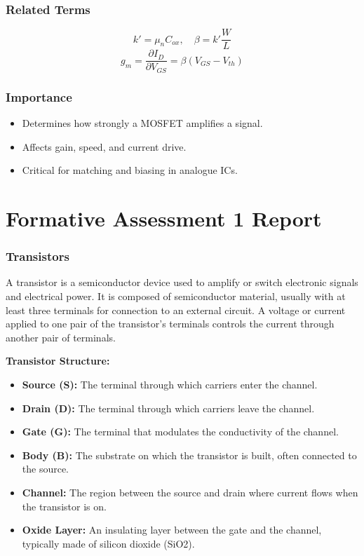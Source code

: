 \documentclass[a4paper,12pt]{article}
\begin{document}
\subsubsection{Related Terms}
\[
k' = \mu_n C_{ox}, \quad \beta = k'\frac{W}{L}
\]
\[
g_m = \frac{\partial I_D}{\partial V_{GS}} = \beta(V_{GS} - V_{th})
\]

\subsubsection{Importance}
\begin{itemize}
    \item Determines how strongly a MOSFET amplifies a signal.
    \item Affects gain, speed, and current drive.
    \item Critical for matching and biasing in analogue ICs.
\end{itemize}

\section{Formative Assessment 1 Report}

\subsubsection{Transistors}
A transistor is a semiconductor device used to amplify or switch electronic signals and electrical power. 
It is composed of semiconductor material, usually with at least three terminals for connection to an external circuit. A voltage or current applied to one pair of the transistor's terminals controls the current through another pair of terminals.

\textbf{Transistor Structure:}

\begin{itemize}
    \item \textbf{Source (S):} The terminal through which carriers enter the channel.
    \item \textbf{Drain (D):} The terminal through which carriers leave the channel.
    \item \textbf{Gate (G):} The terminal that modulates the conductivity of the channel.
    \item \textbf{Body (B):} The substrate on which the transistor is built, often connected to the source.
    \item \textbf{Channel:} The region between the source and drain where current flows when the transistor is on.  
    \item \textbf{Oxide Layer:} An insulating layer between the gate and the channel, typically made of silicon dioxide (SiO2).
\end{itemize}
\end{document}
